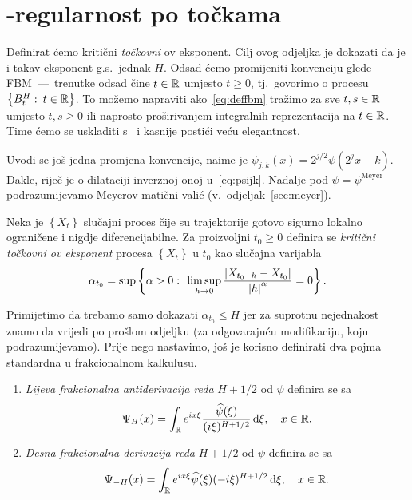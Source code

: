\documentclass[main.tex]{subfiles}
\begin{document}
\nocite{*}

\section{\holder -regularnost po točkama}\label{sec:holpo}
Definirat ćemo kritični \emph{točkovni} \holder ov eksponent.
Cilj ovog odjeljka je dokazati da je i takav eksponent g.s.\ jednak \( H \). Odsad ćemo promijeniti konvenciju glede FBM~---~trenutke
odsad čine \( t \in \mathbb{R} \) umjesto \( t \ge 0 \), tj.\ govorimo
o procesu \( \left\{ B^H_t \, \colon \, t \in \mathbb{R} \right\} \).
To možemo napraviti ako~\eqref{eq:deffbm} tražimo
za sve \( t,s \in \mathbb{R} \) umjesto \( t,s \ge 0 \) ili
naprosto proširivanjem integralnih reprezentacija na \( t \in \mathbb{R} \).
Time ćemo se uskladiti s~\cite{ayache} i kasnije
postići veću elegantnost.

Uvodi se još jedna promjena konvencije, naime je \( \psi_{j,k}(x) = 2^{j/2}\psi(2^jx-k) \). Dakle, riječ je o dilataciji inverznoj onoj u~\eqref{eq:psijk}.
Nadalje pod \( \psi = \psi^{\mathrm{Meyer}}\) podrazumijevamo
Meyerov matični valić (v.~odjeljak~\ref{sec:meyer}).


\begin{definicija}\label{def:holpo}
	Neka je \( \left\{ X_t \right\} \) slučajni proces čije su trajektorije gotovo sigurno
	lokalno ograničene i nigdje diferencijabilne. Za proizvoljni
	\( t_0 \ge 0 \) definira se \emph{kritični točkovni \holder ov eksponent} procesa
	\( \left\{ X_t \right\} \) u \( t_0 \) kao slučajna varijabla
	\begin{equation}
		\alpha_{t_0} = \sup \left\{ \alpha > 0 \, \colon \,
		\limsup\limits_{h \rightarrow 0} \frac{\left| {X_{t_0+h}-X_{t_0}} \right|}{\left| {h} \right|^\alpha} = 0
		\right\}.
	\end{equation}
\end{definicija}

Primijetimo da trebamo samo dokazati \( \alpha_{t_0} \le H \)
jer za suprotnu nejednakost znamo da vrijedi po prošlom odjeljku (za odgovarajuću
modifikaciju, koju podrazumijevamo).
Prije nego nastavimo, još je korisno definirati dva pojma
standardna u frakcionalnom kalkulusu.

\begin{definicija}
	\begin{enumerate}
		\item \emph{Lijeva frakcionalna antiderivacija reda} \( H+1/2 \) od \( \psi \) definira se sa
		      \begin{equation}
			      \Psi_H(x) = \int_{\mathbb{R}} e^{ix\xi} \frac{\widehat{\psi}(\xi)}{(i\xi)^{H+1/2}} \,\mathrm d \xi, \quad x \in \mathbb{R}.
		      \end{equation}
		\item \emph{Desna frakcionalna derivacija reda} \( H+1/2 \) od \( \psi \) definira se sa
		      \begin{equation}
			      \Psi_{-H}(x)= \int_{\mathbb{R}} e^{ix\xi}\widehat{\psi}(\xi)(-i\xi)^{H+1/2} \,\mathrm d \xi, \quad x \in \mathbb{R}.
		      \end{equation}
	\end{enumerate}
\end{definicija}
\end{document}
